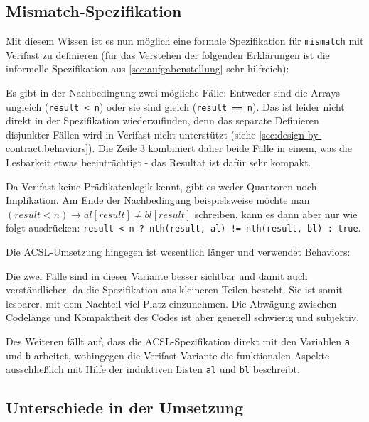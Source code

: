 \subsection{Mismatch-Spezifikation}

Mit diesem Wissen ist es nun möglich eine formale Spezifikation für \lstinline{mismatch} mit Verifast
zu definieren (für das Verstehen der folgenden Erklärungen ist die informelle Spezifikation aus 
\ref{sec:aufgabenstellung} sehr hilfreich):



Es gibt in der Nachbedingung zwei mögliche Fälle: Entweder sind die Arrays ungleich
(\lstinline{result < n}) oder sie sind gleich (\lstinline{result == n}). Das ist leider nicht direkt
in der Spezifikation wiederzufinden, denn das separate Definieren disjunkter Fällen wird in Verifast 
nicht unterstützt (siehe \ref{sec:design-by-contract:behaviors}). Die Zeile 3 kombiniert daher beide Fälle 
in einem, was die Lesbarkeit etwas beeinträchtigt - das Resultat ist dafür sehr kompakt.

Da Verifast keine Prädikatenlogik kennt, gibt es weder Quantoren noch Implikation. Am Ende der
Nachbedingung beispielsweise möchte man \((result < n) \rightarrow al[result] \neq  bl[result]\)
schreiben, kann es dann aber nur wie folgt ausdrücken: 
\lstinline{result < n ? nth(result, al) != nth(result, bl) : true}.

Die ACSL-Umsetzung hingegen ist wesentlich länger und verwendet Behaviors:



Die zwei Fälle sind in dieser Variante besser sichtbar und damit auch verständlicher, da die Spezifikation
aus kleineren Teilen besteht. Sie ist somit lesbarer, mit dem Nachteil viel Platz einzunehmen.
Die Abwägung zwischen Codelänge und Kompaktheit des Codes ist aber generell schwierig und subjektiv.

Des Weiteren fällt auf, dass die ACSL-Spezifikation direkt mit den Variablen \lstinline{a} und
\lstinline{b} arbeitet, wohingegen die Verifast-Variante die funktionalen Aspekte ausschließlich
mit Hilfe der induktiven Listen \lstinline{al} und \lstinline{bl} beschreibt. 



\subsection{Unterschiede in der Umsetzung}

